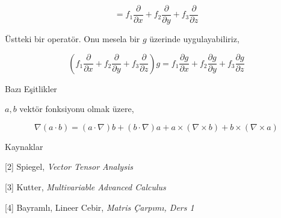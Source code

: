 \documentclass[12pt,fleqn]{article}\usepackage{../../common}
\begin{document}
$$
= f_1 \frac{\partial }{\partial x} +
f_2 \frac{\partial }{\partial y} +
f_3 \frac{\partial }{\partial z} 
$$

Üstteki bir operatör. Onu mesela bir $g$ üzerinde uygulayabiliriz,

$$
(f_1 \frac{\partial }{\partial x} +
f_2 \frac{\partial }{\partial y} +
f_3 \frac{\partial }{\partial z}) 
g = 
f_1 \frac{\partial g}{\partial x} +
f_2 \frac{\partial g}{\partial y} +
f_3 \frac{\partial g}{\partial z} 
$$



Bazı Eşitlikler

$a,b$ vektör fonksiyonu olmak üzere, 

$$
\nabla (a \cdot b) = 
(a \cdot \nabla) b + (b \cdot \nabla) a + 
a \times (\nabla \times b) + 
b \times (\nabla \times a)
$$









Kaynaklar 

[2] Spiegel, {\em Vector Tensor Analysis}

[3] Kutter, {\em Multivariable Advanced Calculus}

[4] Bayramlı, Lineer Cebir, {\em Matris Çarpımı, Ders 1}
\end{document}
